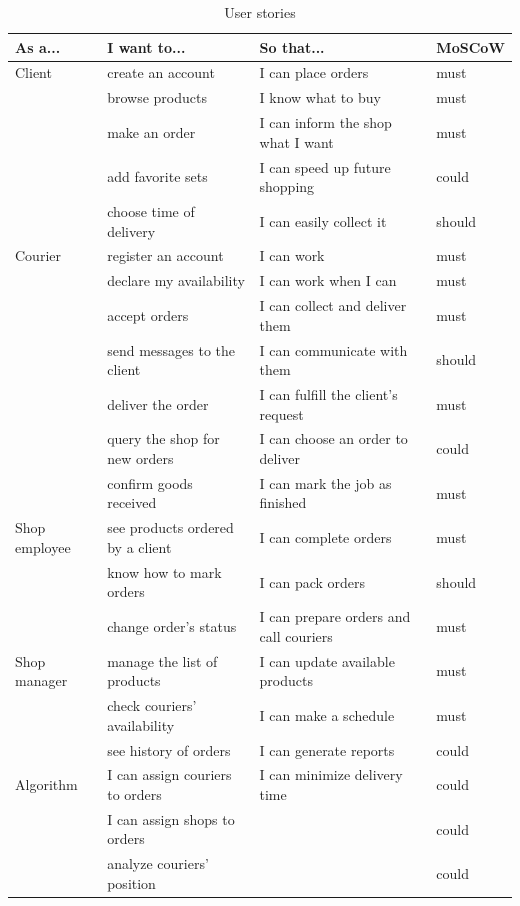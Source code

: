 \documentclass[../main.tex]{subfiles}
\begin{document}
\begin{itemize}
\begin{table}[h!]
    \centering
    \begin{tabular}{l|l|l|l}
        \toprule
        \textbf{As a...} & \textbf{I want to...} & \textbf{So that...} & \textbf{MoSCoW} \\
        \midrule
        Client & create an account & I can place orders & must \\
        & browse products & I know what to buy & must \\
        & make an order & I can inform the shop what I want & must \\
        & add favorite sets & I can speed up future shopping & could \\
        & choose time of delivery & I can easily collect it & should \\
        \midrule
        Courier & register an account & I can work & must \\
        & declare my availability & I can work when I can & must \\
        & accept orders & I can collect and deliver them & must \\
        & send messages to the client & I can communicate with them & should \\
        & deliver the order & I can fulfill the client's request & must \\
        & query the shop for new orders & I can choose an order to deliver & could \\
        & confirm goods received & I can mark the job as finished & must \\
        \midrule
        Shop employee & see products ordered by a client & I can complete orders & must \\
        & know how to mark orders & I can pack orders & should \\
        & change order's status & I can prepare orders and call couriers & must \\
        \midrule
        Shop manager & manage the list of products & I can update available products & must \\
        & check couriers' availability & I can make a schedule & must \\
        & see history of orders & I can generate reports & could\\
        \midrule
        Algorithm & I can assign couriers to orders & I can minimize delivery time & could \\
        & I can assign shops to orders &  & could \\
        & analyze couriers' position & & could \\
        \bottomrule
    \end{tabular}
    \caption{User stories}
    \label{tab:user_stories}
\end{table}


\end{itemize}
\end{document}
